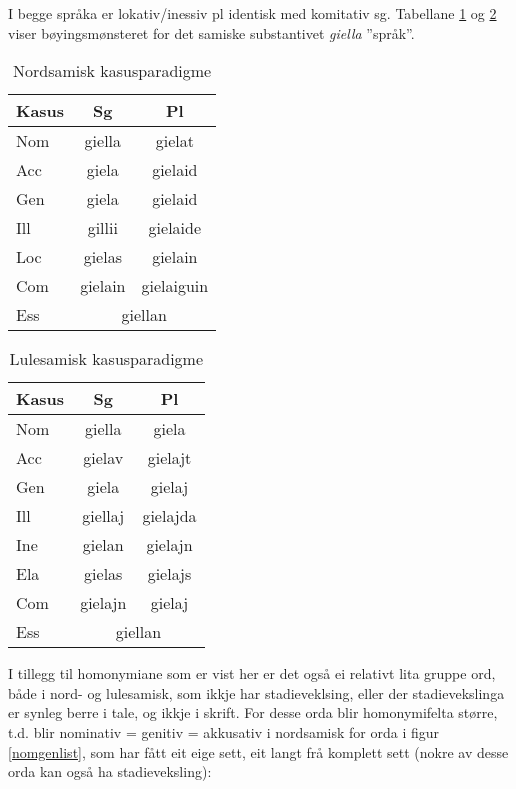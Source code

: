 \documentclass[a4paper,nynorsk]{article}
\begin{document}
I begge språka er lokativ/inessiv pl identisk med komitativ sg. Tabellane \ref{smecas} og \ref{smjcas} viser bøyingsmønsteret for det samiske substantivet \emph{giella} ''språk''.%

\begin{table}[htdp]
\caption{Nordsamisk kasusparadigme}
\begin{center}
\begin{tabular}{|l|c|c|}
\hline
Kasus  & Sg & Pl \\
\hline
Nom & giella & gielat \\
\hline
Acc & giela & gielaid \\\cline{1-1}
Gen & giela & gielaid \\
\hline
Ill & gillii & gielaide \\
\hline
Loc & gielas & gielain \\
\hline
Com & gielain & gielaiguin \\
\hline
Ess & \multicolumn{2}{c|}{giellan}  \\
\hline
\end{tabular}
\end{center}
\label{smecas}
\end{table}%

\begin{table}[htdp]
\caption{Lulesamisk kasusparadigme}
\begin{center}
\begin{tabular}{|l|c|c|}
\hline
Kasus  & Sg & Pl \\
\hline
Nom & giella & giela \\
\hline
Acc & gielav & gielajt \\
\hline
Gen & giela & gielaj \\
\hline
Ill & giellaj & gielajda \\
\hline
Ine & gielan & gielajn \\
\hline
Ela & gielas & gielajs \\
\hline
Com & gielajn & gielaj \\
\hline
Ess & \multicolumn{2}{c|}{giellan}  \\
\hline
\end{tabular}
\end{center}
\label{smjcas}
\end{table}%

I tillegg til homonymiane som er vist her er det også ei relativt lita gruppe ord, både i nord- og lulesamisk, som ikkje har stadieveklsing, eller der stadievekslinga er synleg berre i tale, og ikkje i skrift. For desse orda blir homonymifelta større, t.d. blir nominativ = genitiv = akkusativ i nordsamisk for  orda i figur \ref{nomgenlist}, som har fått eit eige sett, eit langt frå komplett sett (nokre av desse orda kan også ha stadieveksling):%
\end{document}
